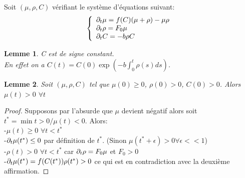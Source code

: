 \newtheorem{lemma}{Lemme}
Soit $(\mu,\rho,C)$ vérifiant le système d’équations suivant:
\begin{equation} \left\{
                \begin{array}{ll}
                   \partial_t\mu  = f(C)(\mu + \rho) -\mu\rho\\
                 \partial_t\rho=  F_0 \mu \\
                  \partial_t C = -b\rho C
                \end{array}
              \right.
\end{equation} 

\begin{lemma}C est de signe constant.\\
En effet on a $C(t)= C(0)\exp(-b\int_{0}^{t}\rho(s)ds)$.
\end{lemma}

\begin{lemma}Soit $(\mu,\rho,C)$ tel que $\mu(0)\geq 0$, $\rho(0) >0$, $C(0)>0$. Alors $\mu(t)>0$ $\forall t$
\end{lemma}
\begin{proof}
Supposons par l'absurde que $\mu$ devient négatif alors soit $t^*= \min{t>0/ \mu(t)<0}$. Alors: \\
-$\mu(t)\geq 0$ $\forall t<t^*$\\
-$\partial_t\mu(t^*) \leq 0$ par définition de $t^*$. (Sinon $\mu(t^*+\epsilon)>0 \forall \epsilon <<1$)\\
-$\rho(t)>0$ $\forall t<t^*$ car $\partial_t\rho=  F_0 \mu$ et $F_0>0$\\
-$\partial_t\mu(t^*) = f(C(t^*))\rho(t^*) > 0$ ce qui est en contradiction avec la deuxième affirmation.
\end{proof}
